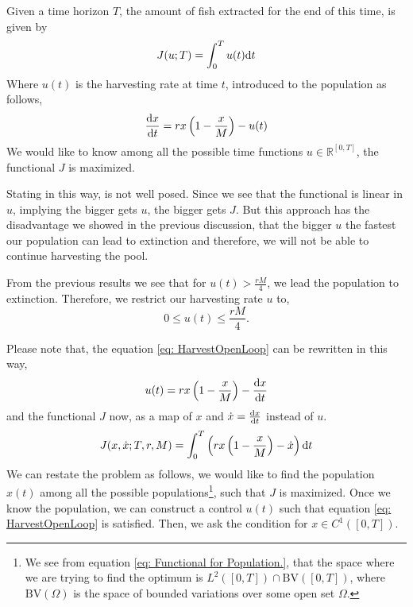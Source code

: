 Given a time horizon $T$, the amount of fish extracted for the end of this time, is given by
\begin{equation}
	J(u;T)=\int_{0}^{T} u(t)\mathrm{d} t
\end{equation}
Where $u(t)$ is the harvesting rate at time $t$, introduced to the population as follows,
\begin{equation}
	\frac{\mathrm{d} x}{{\mathrm{d} t}}=rx\left(1-\frac{x}{M}\right)-u(t) \label{eq: HarvestOpenLoop}
\end{equation}
We would like to know among all the possible time functions $u\in \mathbb{R}^{[0,T]}$, the functional $J$ is maximized. 

Stating in this way, is not well posed. Since we see that the functional is linear in $u$, implying the bigger gets $u$, the bigger gets $J$. But this approach has the disadvantage we showed in the previous discussion, that the bigger $u$ the fastest our population can lead to extinction and therefore, we will not be able to continue harvesting the pool. 

From the previous results we see that for $u(t)>\frac{rM}{4}$, we lead the population to extinction. Therefore, we restrict our harvesting rate $u$ to,
\begin{equation}
0\leq u(t)\leq\frac{rM}{4}. \label{eq: OpenLoopConstrain}
\end{equation}

Please note that, the equation \ref{eq: HarvestOpenLoop} can be rewritten in this way,
\begin{equation}
	u(t)=rx\left(1-\frac{x}{M}\right)-\frac{\mathrm{d} x}{{\mathrm{d} t}} \label{eq: OpenLoopControl}
\end{equation}
and the functional $J$ now, as a map of $x$ and $\dot{x}=\frac{\mathrm{d} x}{{\mathrm{d} t}}$ instead of $u$.
\begin{equation}
	J(x,\dot{x};T,r,M)=\int_{0}^{T} \left(rx\left(1-\frac{x}{M}\right)-\dot{x}\right) \mathrm{d} t \label{eq: Functional for Population.}
\end{equation}
We can restate the problem as follows, we would like to find the population $x(t)$ among all the possible populations\footnote{We see from equation \ref{eq: Functional for Population.}, that the space where we are trying to find the optimum is $L^2([0,T])\cap \mathrm{BV}([0,T])$, where $\mathrm{BV}(\Omega)$ is the space of bounded variations over some open set $\Omega$. }, such that $J$ is maximized. Once we know the population, we can construct a control $u(t)$ such that equation \ref{eq: HarvestOpenLoop} is satisfied. Then, we ask the condition for $x \in C^1([0,T])$.

